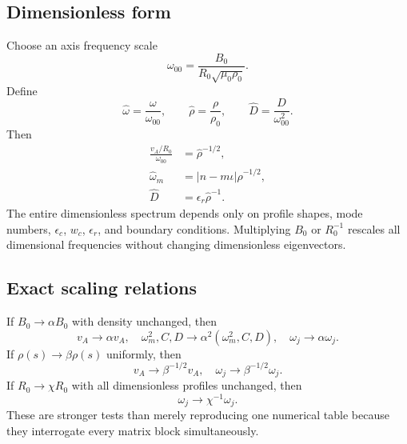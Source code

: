 \subsection{Dimensionless form}
Choose an axis frequency scale
\begin{equation}
\omega_{00}=\frac{B_0}{R_0\sqrt{\mu_0\rho_0}}.
\end{equation}
Define
\begin{equation}
\widehat\omega=\frac{\omega}{\omega_{00}},
\qquad
\widehat\rho=\frac{\rho}{\rho_0},
\qquad
\widehat D=\frac{D}{\omega_{00}^2}.
\end{equation}
Then
\begin{align}
\frac{v_A/R_0}{\omega_{00}}&=\widehat\rho^{-1/2},\\
\widehat\omega_m&=|n-m\iota|\widehat\rho^{-1/2},\\
\widehat D&=\epsilon_r\widehat\rho^{-1}.
\end{align}
The entire dimensionless spectrum depends only on profile shapes, mode numbers, $\epsilon_c$, $w_c$, $\epsilon_r$, and boundary conditions. Multiplying $B_0$ or $R_0^{-1}$ rescales all dimensional frequencies without changing dimensionless eigenvectors.

\subsection{Exact scaling relations}
If $B_0\rightarrow\alpha B_0$ with density unchanged, then
\begin{equation}
v_A\rightarrow\alpha v_A,
\quad
\omega_m^2,C,D\rightarrow\alpha^2(\omega_m^2,C,D),
\quad
\omega_j\rightarrow\alpha\omega_j.
\label{eq:B_scaling}
\end{equation}
If $\rho(s)\rightarrow\beta\rho(s)$ uniformly, then
\begin{equation}
v_A\rightarrow\beta^{-1/2}v_A,
\quad
\omega_j\rightarrow\beta^{-1/2}\omega_j.
\label{eq:rho_scaling}
\end{equation}
If $R_0\rightarrow\chi R_0$ with all dimensionless profiles unchanged, then
\begin{equation}
\omega_j\rightarrow\chi^{-1}\omega_j.
\label{eq:R_scaling}
\end{equation}
These are stronger tests than merely reproducing one numerical table because they interrogate every matrix block simultaneously.
